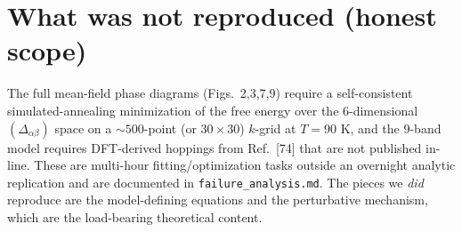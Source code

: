 \documentclass[11pt]{article}
\begin{document}
\section{What was not reproduced (honest scope)}
The full mean-field phase diagrams (Figs.~2,3,7,9) require a self-consistent
simulated-annealing minimization of the free energy over the $6$-dimensional
$(\Delta_{\alpha\beta})$ space on a $\sim500$-point (or $30\times30$) $k$-grid at
$T=90$ K, and the 9-band model requires DFT-derived hoppings from Ref.~[74] that
are not published in-line. These are multi-hour fitting/optimization tasks outside
an overnight analytic replication and are documented in
\texttt{failure\_analysis.md}. The pieces we \emph{did} reproduce are the
model-defining equations and the perturbative mechanism, which are the load-bearing
theoretical content.
\end{document}
